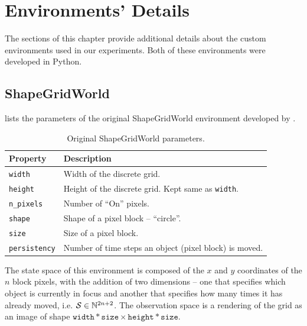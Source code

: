 \chapter{Environments' Details}
\label{sec:environments-details}
The sections of this chapter provide additional details about the custom environments used in our experiments.
Both of these environments were developed in Python.

\section{ShapeGridWorld}
\label{sec:sgw-details}
 lists the parameters of the original ShapeGridWorld environment developed by \cite{rair}.
\begin{table}[H]
    \centering
    \begin{tabularx}{\textwidth}{C{3.9cm} L}
        \hline
        Property & Description\\
        \hline
        \texttt{width} & Width of the discrete grid.\\
        \texttt{height} & Height of the discrete grid. Kept same as \texttt{width}.\\
        \texttt{n\_pixels} & Number of ``On'' pixels.\\
        \texttt{shape} & Shape of a pixel block -- ``circle''.\\
        \texttt{size} & Size of a pixel block.\\
        \texttt{persistency} & Number of time steps an object (pixel block) is moved. \\
        \hline
    \end{tabularx}
    \caption{Original ShapeGridWorld parameters.}
    \label{tab:original-sgw-params}
\end{table}
The state space of this environment is composed of the \(x\) and \(y\) coordinates of the \(n\) block pixels, with the addition of two dimensions -- one that specifies which object is currently in focus and another that specifies how many times it has already moved, i.e. \(\mathcal{S} \in \mathbb{N}^{2 n + 2}\).
The observation space is a rendering of the grid as an image of shape \(\texttt{width} * \texttt{size} \times \texttt{height} * \texttt{size}\).

